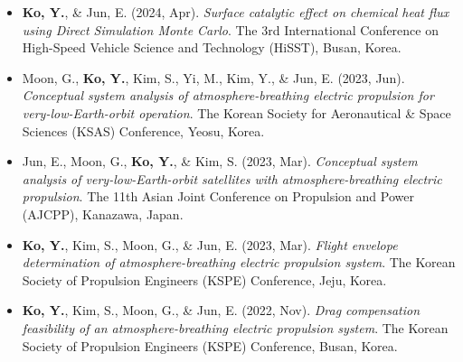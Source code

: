 \begin{itemize}[leftmargin=0.45in, label={}]
            \item [{[C5]}] \textbf{Ko, Y.}, \& Jun, E. (2024, Apr). \textit{Surface catalytic effect on chemical heat flux using Direct Simulation Monte Carlo}. The 3rd International Conference on High-Speed Vehicle Science and Technology (HiSST), Busan, Korea.
            \item [{[C4]}] Moon, G., \textbf{Ko, Y.}, Kim, S., Yi, M., Kim, Y., \& Jun, E. (2023, Jun). \textit{Conceptual system analysis of atmosphere-breathing electric propulsion for very-low-Earth-orbit operation}. The Korean Society for Aeronautical \& Space Sciences (KSAS) Conference, Yeosu, Korea.
            \item [{[C3]}] Jun, E., Moon, G., \textbf{Ko, Y.}, \& Kim, S. (2023, Mar). \textit{Conceptual system analysis of very-low-Earth-orbit satellites with atmosphere-breathing electric propulsion}. The 11th Asian Joint Conference on Propulsion and Power (AJCPP), Kanazawa, Japan.
            \item [{[C2]}] \textbf{Ko, Y.}, Kim, S., Moon, G., \& Jun, E. (2023, Mar). \textit{Flight envelope determination of atmosphere-breathing electric propulsion system}. The Korean Society of Propulsion Engineers (KSPE) Conference, Jeju, Korea.
            \item [{[C1]}] \textbf{Ko, Y.}, Kim, S., Moon, G., \& Jun, E. (2022, Nov). \textit{Drag compensation feasibility of an atmosphere-breathing electric propulsion system}. The Korean Society of Propulsion Engineers (KSPE) Conference, Busan, Korea.
        \end{itemize}
        
    \resumeSubHeadingListEnd